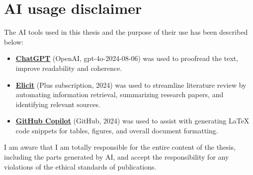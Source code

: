 \chapter*{AI usage disclaimer}

The AI tools used in this thesis and the purpose of their use has been described below:
\begin{itemize}
    \item \textbf{\href{https://platform.openai.com/docs/models}{ChatGPT}} (OpenAI, gpt-4o-2024-08-06) was used to proofread the text, improve readability and coherence.
    \item \textbf{\href{elicit.com}{Elicit}}\cite{elicit} (Plus subscription, 2024) was used to streamline literature review by automating information retrieval, summarizing research papers, and identifying relevant sources.
    \item \textbf{\href{https://docs.github.com/en/copilot}{GitHub Copilot}} (GitHub, 2024) was used to assist with generating LaTeX code snippets for tables, figures, and overall document formatting.
\end{itemize}

I am aware that I am totally responsible for the entire content of the thesis, including the parts generated by AI, and accept the responsibility for any violations of the ethical standards of publications.

\clearpage
